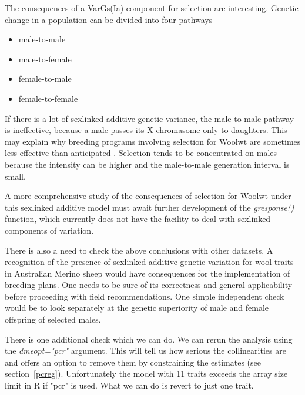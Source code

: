 \documentclass[titlepage]{article}  %
\begin{document}
The consequences of a VarGs(Ia) component for selection are interesting. Genetic change in a population can be divided into four pathways
\begin{itemize}
\item male-to-male
\item male-to-female
\item female-to-male
\item female-to-female
\end{itemize}
If there is a lot of sexlinked additive genetic variance, the male-to-male pathway is ineffective, because a male passes its X chromasome only to daughters. This may explain why breeding programs involving selection for Woolwt are sometimes less effective than anticipated . Selection tends to be concentrated on males because the intensity can be higher and the male-to-male generation interval is small.

A more comprehensive study of the consequences of selection for Woolwt under this sexlinked additive model must await further development of the {\em gresponse()} function, which currently does not have the facility to deal with sexlinked components of variation.

There is also a need to check the above conclusions with other datasets. A recognition of the presence of sexlinked additive genetic variation for wool traits in Australian Merino sheep would have consequences for the implementation of breeding plans. One needs to be sure of its correctness and general applicability before proceeding with field recommendations. One simple independent check would be to look separately at the genetic superiority of male and female offspring of selected males.

There is one additional check which we can do. We can rerun the analysis using the {\em dmeopt="pcr"} argument. This will tell us how serious the collinearities are and offers an option to remove them by constraining the estimates (see section~\ref{pcreg}). Unfortunately the model with 11 traits exceeds the array size limit in R if "pcr" is used. What we can do is revert to just one trait.
\end{document}

